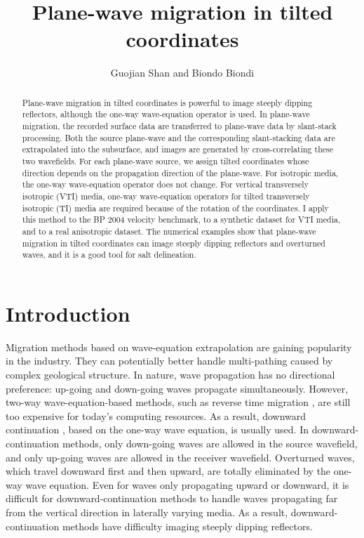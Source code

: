 \title{Plane-wave migration in tilted coordinates}
\author{Guojian Shan and Biondo Biondi}

\maketitle

\begin{abstract}
Plane-wave migration in tilted coordinates is powerful to image steeply dipping reflectors, 
although the one-way wave-equation operator is used. In plane-wave migration, 
the recorded surface data are transferred to plane-wave data by slant-stack processing. 
Both the source plane-wave and the corresponding slant-stacking data
are extrapolated into the subsurface, and images are generated by cross-correlating these two
wavefields. For each plane-wave source, we assign tilted coordinates whose direction depends on
the propagation direction of the plane-wave. For isotropic media, the one-way wave-equation
operator does not change. For vertical transversely isotropic (VTI) media, 
one-way wave-equation operators for tilted transversely isotropic (TI) media are
required because of the rotation of the coordinates. I apply this method to the BP 2004 velocity benchmark,
 to a synthetic dataset for VTI media, and to a real anisotropic dataset. The numerical examples show
that plane-wave migration in tilted coordinates can image steeply dipping reflectors 
and overturned waves, and it is a good tool for salt delineation.
\end{abstract}

\section{Introduction}
Migration methods based on wave-equation extrapolation are gaining popularity in the 
industry. They can potentially better handle multi-pathing caused by complex geological 
structure. In nature, wave propagation has no directional preference: up-going and 
down-going waves propagate simultaneously. However, two-way wave-equation-based methods, 
such as reverse time migration \cite{SEG-1983-S10.1,GEO.48.11.15141524,SEG-2002-12841287}, are still too expensive
 for today's computing resources. As a result, downward continuation \cite{jon1985book}, 
based on the one-way wave equation, is usually used. In downward-continuation methods, 
only down-going waves are allowed in the source wavefield, and only up-going waves are 
allowed in the receiver wavefield. Overturned waves, which travel downward first and 
then upward, are totally eliminated by the one-way wave equation.  
Even for waves only propagating upward or downward, it is difficult for downward-continuation methods to handle waves propagating 
far from the vertical direction in laterally varying media. As a result, downward-continuation methods have 
difficulty imaging steeply dipping reflectors.

